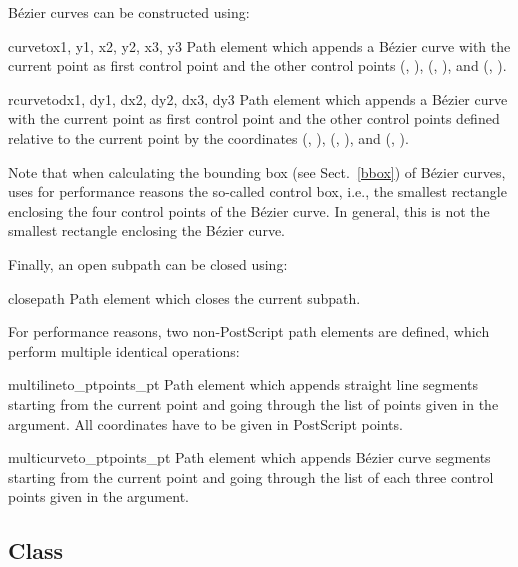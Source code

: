 B\'ezier curves can be constructed using: \

\begin{classdesc}{curveto}{x1, y1, x2, y2, x3, y3}
Path element which appends a B\'ezier curve with
the current point as first control point and the other control points
(, ), (, ), and (, ).
\end{classdesc}

\begin{classdesc}{rcurveto}{dx1, dy1, dx2, dy2, dx3, dy3}
Path element which appends a B\'ezier curve with
the current point as first control point and the other control points
defined relative to the current point by the coordinates
(, ), (, ), and (, ).
\end{classdesc}

Note that when calculating the bounding box (see Sect.~\ref{bbox}) of
B\'ezier curves, \PyX{} uses for performance reasons the so-called
control box, i.e., the smallest rectangle enclosing the four control
points of the B\'ezier curve. In general, this is not the smallest
rectangle enclosing the B\'ezier curve.

Finally, an open subpath can be closed using:

\begin{classdesc}{closepath}{}
Path element which closes the current subpath.
\end{classdesc}

For performance reasons, two non-PostScript path elements are defined, 
which perform multiple identical operations:

\begin{classdesc}{multilineto_pt}{points_pt}
Path element which appends straight line segments starting from
the current point and going through the list of points given 
in the  argument. All coordinates have to 
be given in PostScript points.
\end{classdesc}

\begin{classdesc}{multicurveto_pt}{points_pt}
Path element which appends B\'ezier curve segments starting from
the current point and going through the list of each three control
points given in the  argument.
\end{classdesc}


\subsection{Class }

